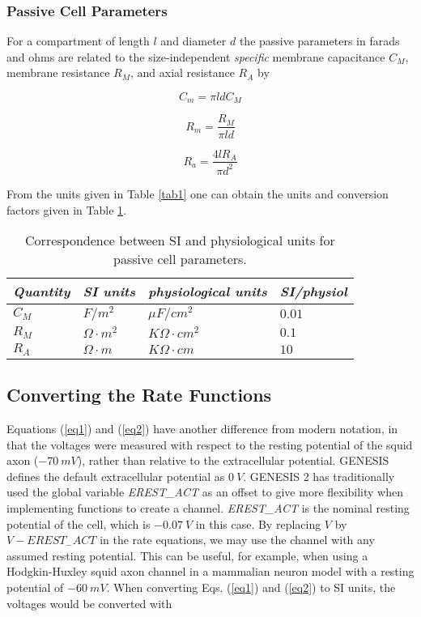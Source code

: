 \documentclass[12pt]{article}
\begin{document}
\subsubsection{Passive Cell Parameters}

For a compartment of length $l$ and diameter $d$ the passive parameters
in farads and ohms are related to the size-independent {\em specific} membrane
capacitance $C_M$, membrane resistance $R_M$, and axial resistance $R_A$ by

\begin{equation}
C_{m} =  \pi l d C_M
\end{equation}

\begin{equation}
R_{m} = \frac{R_M}{\pi l d}
\end{equation}

\begin{equation}
R_{a}= \frac{4 l R_A}{\pi d^{2}}
\end{equation}
 
From the units given in Table \ref{tab1} one can obtain the units and
conversion factors given in Table \ref{tab2}.

\begin{table}[thb]
\label{tab2}
\centering
\begin{tabular}{llll} \hline
{\em Quantity} & {\em SI units} & {\em physiological units} & {\em SI/physiol} \\
\hline
  $C_M$  & $F/m^2$ &$\mu F/cm^2$  & $0.01$  \\
  $R_M$  & $\Omega \cdot m^2$ & $K \Omega \cdot cm^2$ & $0.1$ \\
  $R_A$  & $\Omega \cdot m$   & $K \Omega \cdot cm$ & $10$   \\
\hline
\end{tabular}
\caption{Correspondence between SI and physiological units for passive
cell parameters.}
\end{table}

\subsection{Converting the Rate Functions}

Equations (\ref{eq1}) and (\ref{eq2}) have another difference from modern
notation, in that the voltages were measured with respect to the resting
potential of the squid axon ($-70~mV$), rather than relative to the
extracellular potential.  GENESIS defines the default extracellular
potential as $0~V$.  GENESIS 2 has traditionally used the global variable
{\em EREST\_ACT} as an offset to give more flexibility when implementing
functions to create a channel.  {\em EREST\_ACT} is the nominal resting
potential of the cell, which is $-0.07~V$ in this case.  By replacing $V$
by $V - EREST_{-}ACT$ in the rate equations, we may use the channel with
any assumed resting potential.  This can be useful, for example, when using
a Hodgkin-Huxley squid axon channel in a mammalian neuron model with a
resting potential of $-60~mV$.  When converting Eqs. (\ref{eq1}) and
(\ref{eq2}) to SI units, the voltages would be converted with
\end{document}
